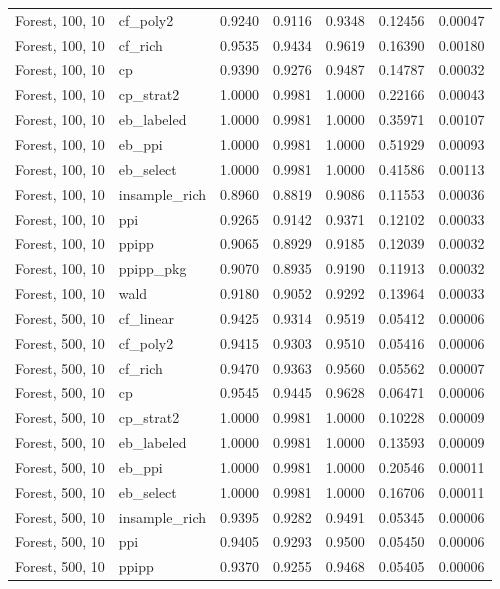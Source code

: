 \begin{longtable}{llrrrrr}
Forest, 100, 10 & cf\_poly2 & 0.9240 & 0.9116 & 0.9348 & 0.12456 & 0.00047 \\
Forest, 100, 10 & cf\_rich & 0.9535 & 0.9434 & 0.9619 & 0.16390 & 0.00180 \\
Forest, 100, 10 & cp & 0.9390 & 0.9276 & 0.9487 & 0.14787 & 0.00032 \\
Forest, 100, 10 & cp\_strat2 & 1.0000 & 0.9981 & 1.0000 & 0.22166 & 0.00043 \\
Forest, 100, 10 & eb\_labeled & 1.0000 & 0.9981 & 1.0000 & 0.35971 & 0.00107 \\
Forest, 100, 10 & eb\_ppi & 1.0000 & 0.9981 & 1.0000 & 0.51929 & 0.00093 \\
Forest, 100, 10 & eb\_select & 1.0000 & 0.9981 & 1.0000 & 0.41586 & 0.00113 \\
Forest, 100, 10 & insample\_rich & 0.8960 & 0.8819 & 0.9086 & 0.11553 & 0.00036 \\
Forest, 100, 10 & ppi & 0.9265 & 0.9142 & 0.9371 & 0.12102 & 0.00033 \\
Forest, 100, 10 & ppipp & 0.9065 & 0.8929 & 0.9185 & 0.12039 & 0.00032 \\
Forest, 100, 10 & ppipp\_pkg & 0.9070 & 0.8935 & 0.9190 & 0.11913 & 0.00032 \\
Forest, 100, 10 & wald & 0.9180 & 0.9052 & 0.9292 & 0.13964 & 0.00033 \\
Forest, 500, 10 & cf\_linear & 0.9425 & 0.9314 & 0.9519 & 0.05412 & 0.00006 \\
Forest, 500, 10 & cf\_poly2 & 0.9415 & 0.9303 & 0.9510 & 0.05416 & 0.00006 \\
Forest, 500, 10 & cf\_rich & 0.9470 & 0.9363 & 0.9560 & 0.05562 & 0.00007 \\
Forest, 500, 10 & cp & 0.9545 & 0.9445 & 0.9628 & 0.06471 & 0.00006 \\
Forest, 500, 10 & cp\_strat2 & 1.0000 & 0.9981 & 1.0000 & 0.10228 & 0.00009 \\
Forest, 500, 10 & eb\_labeled & 1.0000 & 0.9981 & 1.0000 & 0.13593 & 0.00009 \\
Forest, 500, 10 & eb\_ppi & 1.0000 & 0.9981 & 1.0000 & 0.20546 & 0.00011 \\
Forest, 500, 10 & eb\_select & 1.0000 & 0.9981 & 1.0000 & 0.16706 & 0.00011 \\
Forest, 500, 10 & insample\_rich & 0.9395 & 0.9282 & 0.9491 & 0.05345 & 0.00006 \\
Forest, 500, 10 & ppi & 0.9405 & 0.9293 & 0.9500 & 0.05450 & 0.00006 \\
Forest, 500, 10 & ppipp & 0.9370 & 0.9255 & 0.9468 & 0.05405 & 0.00006 \\

\end{longtable}
